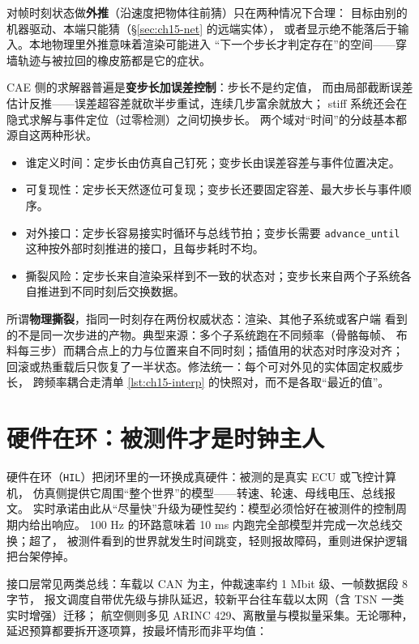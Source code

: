 \documentclass[12pt,a4paper,fontset=fandol]{ctexbook}
\newcommand{\Tp}[1]{\texttt{#1}}
\newcommand{\Lang}[1]{\textsf{#1}}
\newcommand{\DomCAE}{\Lang{CAE}}
\begin{document}
对帧时刻状态做\textbf{外推}（沿速度把物体往前猜）只在两种情况下合理：
目标由别的机器驱动、本端只能猜（\S\ref{sec:ch15-net} 的远端实体），
或者显示绝不能落后于输入。本地物理里外推意味着渲染可能进入
``下一个步长才判定存在''的空间——穿墙轨迹与被拉回的橡皮筋都是它的症状。

\DomCAE{} 侧的求解器普遍是\textbf{变步长加误差控制}：步长不是约定值，
而由局部截断误差估计反推——误差超容差就砍半步重试，连续几步富余就放大；
stiff 系统还会在隐式求解与事件定位（过零检测）之间切换步长。
两个域对``时间''的分歧基本都源自这两种形状。

\begin{compare}[title={定步长与变步长的分工与代价}]
\begin{itemize}
  \item 谁定义时间：定步长由仿真自己钉死；变步长由误差容差与事件位置决定。
  \item 可复现性：定步长天然逐位可复现；变步长还要固定容差、最大步长与事件顺序。
  \item 对外接口：定步长容易接实时循环与总线节拍；变步长需要 \Tp{advance\_until} 这种按外部时刻推进的接口，且每步耗时不均。
  \item 撕裂风险：定步长来自渲染采样到不一致的状态对；变步长来自两个子系统各自推进到不同时刻后交换数据。
\end{itemize}
\end{compare}

所谓\textbf{物理撕裂}，指同一时刻存在两份权威状态：渲染、其他子系统或客户端
看到的不是同一次步进的产物。典型来源：多个子系统跑在不同频率（骨骼每帧、
布料每三步）而耦合点上的力与位置来自不同时刻；插值用的状态对时序没对齐；
回滚或热重载后只恢复了一半状态。修法统一：每个可对外见的实体固定权威步长，
跨频率耦合走清单 \ref{lst:ch15-interp} 的快照对，而不是各取``最近的值''。

\section{硬件在环：被测件才是时钟主人}
\label{sec:ch15-hil-loop}

硬件在环（\Tp{HIL}）把闭环里的一环换成真硬件：被测的是真实 ECU 或飞控计算机，
仿真侧提供它周围``整个世界''的模型——转速、轮速、母线电压、总线报文。
实时承诺由此从``尽量快''升级为硬性契约：模型必须恰好在被测件的控制周期内给出响应。
100 Hz 的环路意味着 10 ms 内跑完全部模型并完成一次总线交换；超了，
被测件看到的世界就发生时间跳变，轻则报故障码，重则进保护逻辑把台架停掉。

接口层常见两类总线：车载以 CAN 为主，仲裁速率约 1 Mbit 级、一帧数据段 8 字节，
报文调度自带优先级与排队延迟，较新平台往车载以太网（含 TSN 一类实时增强）迁移；
航空侧则多见 ARINC 429、离散量与模拟量采集。无论哪种，延迟预算都要拆开逐项算，按最坏情形而非平均值：
\end{document}
